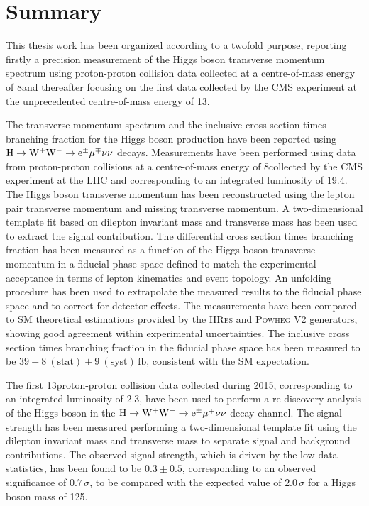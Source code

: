 \chapter*{Summary}
\thispagestyle{empty}

This thesis work has been organized according to a twofold purpose, reporting firstly a precision measurement of the Higgs boson transverse momentum spectrum using proton-proton collision data collected at a centre-of-mass energy of 8\TeV and thereafter focusing on the first data collected by the CMS experiment at the unprecedented centre-of-mass energy of 13\TeV.

The transverse momentum spectrum and the inclusive cross section times branching fraction for the Higgs boson production have been reported using $\rm{H}\to\rm{W^+W^-}\to e^{\pm} \mu^{\mp}\nu\nu$ decays. Measurements have been performed using data from proton-proton collisions at a centre-of-mass energy of 8\TeV collected by the CMS experiment at the LHC and corresponding to an integrated luminosity of 19.4\ifb. The Higgs boson transverse momentum has been reconstructed using the lepton pair transverse momentum and missing transverse momentum. A two-dimensional template fit based on dilepton invariant mass and transverse mass has been used to extract the signal contribution. The differential cross section times branching fraction has been measured as a function of the Higgs boson transverse momentum in a fiducial phase space defined to match the experimental acceptance in terms of lepton kinematics and event topology. An unfolding procedure has been used to extrapolate the measured results to the fiducial phase space and to correct for detector effects.
The measurements have been compared to SM theoretical estimations provided by the \textsc{HRes} and \textsc{Powheg V2} generators, showing good agreement within experimental uncertainties. The inclusive cross section times branching fraction in the fiducial phase space has been measured to be $39\pm 8~(\mathrm{stat}) \pm 9~(\mathrm{syst})\,\mathrm{fb}$, consistent with the SM expectation.

The first 13\TeV proton-proton collision data collected during 2015, corresponding to an integrated luminosity of 2.3\ifb, have been used to perform a re-discovery analysis of the Higgs boson in the $\rm{H}\to\rm{W^+W^-}\to e^{\pm} \mu^{\mp}\nu\nu$ decay channel. The signal strength has been measured performing a two-dimensional template fit using the dilepton invariant mass and transverse mass to separate signal and background contributions.
The observed signal strength, which is driven by the low data statistics, has been found to be $0.3\pm0.5$, corresponding to an observed significance of $0.7\,\sigma$, to be compared with the expected value of $2.0\,\sigma$ for a Higgs boson mass of 125\GeV.

